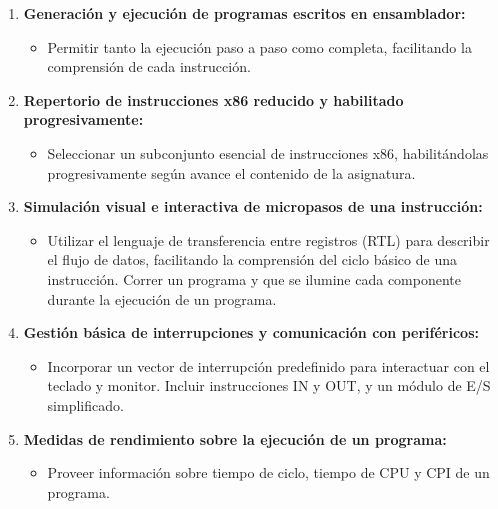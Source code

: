 \documentclass[12pt,twoside]{templates/unerthesis}
\providecommand{\tightlist}{%
  \setlength{\itemsep}{0pt}\setlength{\parskip}{0pt}}
\begin{document}
\begin{enumerate}
\def\labelenumi{\arabic{enumi}.}
\setcounter{enumi}{1}
\tightlist
\item
  \textbf{Generación y ejecución de programas escritos en ensamblador:}

  \begin{itemize}
  \tightlist
  \item
    Permitir tanto la ejecución paso a paso como completa, facilitando la comprensión de cada instrucción.
  \end{itemize}
\item
  \textbf{Repertorio de instrucciones x86 reducido y habilitado progresivamente:}

  \begin{itemize}
  \tightlist
  \item
    Seleccionar un subconjunto esencial de instrucciones x86, habilitándolas progresivamente según avance el contenido de la asignatura.
  \end{itemize}
\item
  \textbf{Simulación visual e interactiva de micropasos de una instrucción:}

  \begin{itemize}
  \tightlist
  \item
    Utilizar el lenguaje de transferencia entre registros (RTL) para describir el flujo de datos, facilitando la comprensión del ciclo básico de una instrucción. Correr un programa y que se ilumine cada componente durante la ejecución de un programa.
  \end{itemize}
\item
  \textbf{Gestión básica de interrupciones y comunicación con periféricos:}

  \begin{itemize}
  \tightlist
  \item
    Incorporar un vector de interrupción predefinido para interactuar con el teclado y monitor. Incluir instrucciones IN y OUT, y un módulo de E/S simplificado.
  \end{itemize}
\item
  \textbf{Medidas de rendimiento sobre la ejecución de un programa:}

  \begin{itemize}
  \tightlist
  \item
    Proveer información sobre tiempo de ciclo, tiempo de CPU y CPI de un programa.
  \end{itemize}
\end{enumerate}
\end{document}
